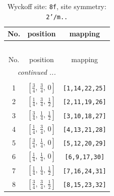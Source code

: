 \documentclass[fleqn,8pt]{jsarticle}
\begin{document}
\begin{longtable}{ccc}
\caption{Wyckoff site: {\tt 8f}, site symmetry: {\tt 2'/m..}}
 \\
 \hline \hline
No. & position & mapping \\ \hline \endfirsthead

\multicolumn{2}{l}{\tablename\ \thetable{}} \\
 \hline \hline
No. & position & mapping \\ \hline \endhead

 \hline \hline
\multicolumn{2}{r}{\footnotesize\it continued ...} \\ \endfoot

 \hline \hline
\multicolumn{2}{r}{} \\ \endlastfoot

1 & $\left[ \frac{3}{4},\, \frac{3}{4},\, 0 \right]$ & {\tt [1,14,22,25]} \\ \hline
2 & $\left[ \frac{1}{4},\, \frac{3}{4},\, \frac{1}{2} \right]$ & {\tt [2,11,19,26]} \\ \hline
3 & $\left[ \frac{3}{4},\, \frac{1}{4},\, \frac{1}{2} \right]$ & {\tt [3,10,18,27]} \\ \hline
4 & $\left[ \frac{1}{4},\, \frac{3}{4},\, 0 \right]$ & {\tt [4,13,21,28]} \\ \hline
5 & $\left[ \frac{3}{4},\, \frac{1}{4},\, 0 \right]$ & {\tt [5,12,20,29]} \\ \hline
6 & $\left[ \frac{1}{4},\, \frac{1}{4},\, 0 \right]$ & {\tt [6,9,17,30]} \\ \hline
7 & $\left[ \frac{1}{4},\, \frac{1}{4},\, \frac{1}{2} \right]$ & {\tt [7,16,24,31]} \\ \hline
8 & $\left[ \frac{3}{4},\, \frac{3}{4},\, \frac{1}{2} \right]$ & {\tt [8,15,23,32]} \\
\end{longtable}
\renewcommand{\arraystretch}{1.2}
\end{document}
